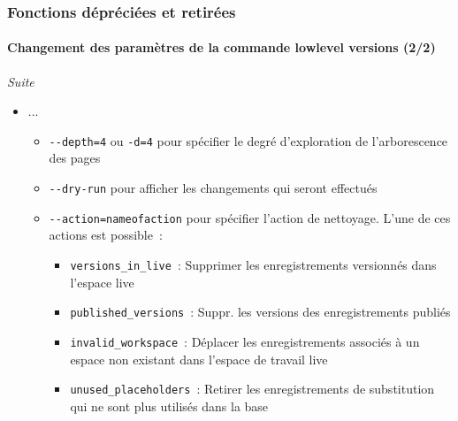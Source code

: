 \begin{frame}[fragile]
	\frametitle{Fonctions dépréciées et retirées}
	\framesubtitle{Changement des paramètres de la commande lowlevel versions (2/2)}

	\small\textit{Suite}\normalsize

	\begin{itemize}
		\item ...
			\begin{itemize}\vspace{-0.1cm}
				\item \texttt{-}\texttt{-depth=4} ou \texttt{-d=4} pour spécifier le degré d'exploration de
					l'arborescence des pages
				\item \texttt{-}\texttt{-dry-run} pour afficher les changements qui seront effectués
				\item \texttt{-}\texttt{-action=nameofaction} pour spécifier l'action de nettoyage.
					L'une de ces actions est possible~:
					\begin{itemize}
						\item \texttt{versions\_in\_live}~: Supprimer les enregistrements versionnés dans l'espace live
						\item \texttt{published\_versions}~: Suppr. les versions des enregistrements publiés
						\item \texttt{invalid\_workspace}~: Déplacer les enregistrements associés à un espace non existant
						dans l'espace de travail live
						\item \texttt{unused\_placeholders}~: Retirer les enregistrements de substitution qui ne sont plus
						utilisés dans la base
					\end{itemize}
			\end{itemize}
	\end{itemize}

\end{frame}


